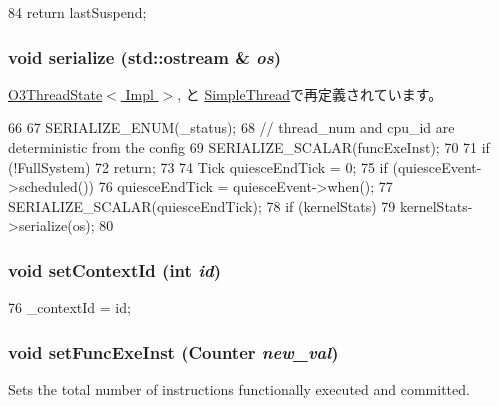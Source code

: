 \begin{DoxyCode}
84 { return lastSuspend; }
\end{DoxyCode}
\hypertarget{structThreadState_a53e036786d17361be4c7320d39c99b84}{
\subsubsection[{serialize}]{\setlength{\rightskip}{0pt plus 5cm}void serialize (std::ostream \& {\em os})}}
\label{structThreadState_a53e036786d17361be4c7320d39c99b84}


\hyperlink{structO3ThreadState_a53e036786d17361be4c7320d39c99b84}{O3ThreadState$<$ Impl $>$}, と \hyperlink{classSimpleThread_a53e036786d17361be4c7320d39c99b84}{SimpleThread}で再定義されています。


\begin{DoxyCode}
66 {
67     SERIALIZE_ENUM(_status);
68     // thread_num and cpu_id are deterministic from the config
69     SERIALIZE_SCALAR(funcExeInst);
70 
71     if (!FullSystem)
72         return;
73 
74     Tick quiesceEndTick = 0;
75     if (quiesceEvent->scheduled())
76         quiesceEndTick = quiesceEvent->when();
77     SERIALIZE_SCALAR(quiesceEndTick);
78     if (kernelStats)
79         kernelStats->serialize(os);
80 }
\end{DoxyCode}
\hypertarget{structThreadState_a0dd10037a5b0eadaddfe7c67d52d3ac6}{
\subsubsection[{setContextId}]{\setlength{\rightskip}{0pt plus 5cm}void setContextId (int {\em id})}}
\label{structThreadState_a0dd10037a5b0eadaddfe7c67d52d3ac6}



\begin{DoxyCode}
76 { _contextId = id; }
\end{DoxyCode}
\hypertarget{structThreadState_aa1adc19bd2d6fd2ca03c47d5fd6561a2}{
\subsubsection[{setFuncExeInst}]{\setlength{\rightskip}{0pt plus 5cm}void setFuncExeInst ({\bf Counter} {\em new\_\-val})}}
\label{structThreadState_aa1adc19bd2d6fd2ca03c47d5fd6561a2}
Sets the total number of instructions functionally executed and committed. 


